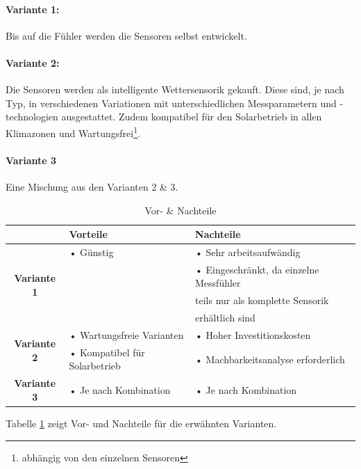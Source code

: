 \paragraph{Variante 1:}

Bis auf die Fühler werden die Sensoren selbst entwickelt.\\

\paragraph{Variante 2:}

Die Sensoren werden als intelligente Wettersensorik gekauft. Diese sind, je nach Typ, in verschiedenen Variationen mit unterschiedlichen Messparametern und -technologien ausgestattet. Zudem kompatibel für den Solarbetrieb in allen Klimazonen und Wartungsfrei\footnote{abhängig von den einzelnen Sensoren}.\\

\newpage
\paragraph{Variante 3}

Eine Mischung aus den Varianten 2 \& 3.\\

\begin{table}[h]
  \centering
  \label{tab:mcu}
  \small
  \caption{Vor- \& Nachteile}
    \begin{tabular}{c|l|l}
          & \textbf{Vorteile} & \textbf{Nachteile} \\
    \toprule
    \multirow{4}[2]{*}{\textbf{Variante 1}} & • Günstig & • Sehr arbeitsaufwändig \\
          &  & • Eingeschränkt, da einzelne Messfühler \\
          &  & \hspace{0.3cm} teils nur als komplette Sensorik \\
          &  & \hspace{0.3cm} erhältlich sind \\
    \hline
    \multirow{2}[1]{*}{\textbf{Variante 2}} & • Wartungsfreie Varianten & • Hoher Investitionskosten \\
          & • Kompatibel für Solarbetrieb & • Machbarkeitsanalyse erforderlich \\
    \hline
    \multirow{4}[1]{*}{\textbf{Variante 3}} &  &   \\
          & •  Je nach Kombination & •  Je nach Kombination  \\
          &    &  \\
    \end{tabular}%
  \label{tab:sensoren}
\end{table}
Tabelle \ref{tab:sensoren} zeigt Vor- und Nachteile für die erwähnten Varianten.\\
%

